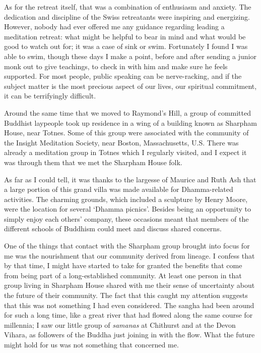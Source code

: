 As for the retreat itself, that was a combination of enthusiasm and
anxiety. The dedication and discipline of the Swiss retreatants were
inspiring and energizing. However, nobody had ever offered me any
guidance regarding leading a meditation retreat: what might be helpful
to bear in mind and what would be good to watch out for; it was a case
of sink or swim. Fortunately I found I was able to swim, though these
days I make a point, before and after sending a junior monk out to give
teachings, to check in with him and make sure he feels supported. For
most people, public speaking can be nerve-racking, and if the subject
matter is the most precious aspect of our lives, our spiritual
commitment, it can be terrifyingly difficult.

Around the same time that we moved to Raymond's Hill, a group of
committed Buddhist laypeople took up residence in a wing of a building
known as Sharpham House\cite{sharpham}, near Totnes.
Some of this group were associated with
the community of the Insight Meditation Society, near Boston,
Massachusetts, U.S. There was already a meditation group in Totnes which
I regularly visited, and I expect it was through them that we met the
Sharpham House folk.

As far as I could tell, it was thanks to the largesse of Maurice and
Ruth Ash that a large portion of this grand villa was made available for
Dhamma-related activities. The charming grounds, which included a
sculpture by Henry Moore, were the location for several `Dhamma
picnics'. Besides being an opportunity to simply enjoy each others'
company, these occasions meant that members of the different schools of
Buddhism could meet and discuss shared concerns.

One of the things that contact with the Sharpham group brought into
focus for me was the nourishment that our community derived from
lineage. I confess that by that time, I might have started to take for
granted the benefits that come from being part of a long-established
community. At least one person in that group living in Sharpham House
shared with me their sense of uncertainty about the future of their
community. The fact that this caught my attention suggests that this was
not something I had even considered. The sangha had been around for such
a long time, like a great river that had flowed along the same course
for millennia; I saw our little group of \emph{samanas} at Chithurst and
at the Devon Vihara, as followers of the Buddha just joining in with the
flow. What the future might hold for us was not something that concerned
me.

